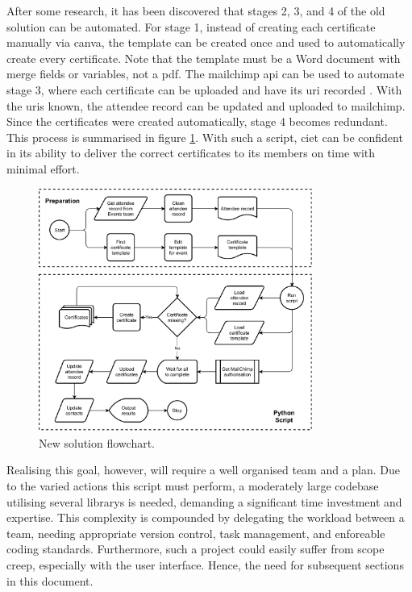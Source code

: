 \documentclass[11pt]{article}
\begin{document}
After some research, it has been discovered that stages 2, 3, and 4 of the old solution can be automated. For stage 1, instead of creating each certificate manually via \Gls{canva}, the template can be created once and used to automatically create every certificate. Note that the template must be a Word document with merge fields or variables, not a \acrshort{pdf}. The \Gls{mailchimp} \acrshort{api} can be used to automate stage 3, where each certificate can be uploaded and have its \acrshort{uri} recorded \cite{mailchimp-first-api-call}. With the \acrshort{uri}s known, the attendee record can be updated and uploaded to \Gls{mailchimp}. Since the certificates were created automatically, stage 4 becomes redundant. This process is summarised in figure \ref{fig:new-solution}. With such a script, \acrshort{ciet} can be confident in its ability to deliver the correct certificates to its members on time with minimal effort.

\begin{figure}[b!]
    \centering
    \includegraphics[width=0.8\textwidth]{figures/new_solution.pdf}
    \caption{New solution flowchart.}
    \label{fig:new-solution}
\end{figure}

Realising this goal, however, will require a well organised team and a plan. Due to the varied actions this script must perform, a moderately large codebase utilising several \glspl{library} is needed, demanding a significant time investment and expertise. This complexity is compounded by delegating the workload between a team, needing appropriate version control, task management, and enforeable coding standards. Furthermore, such a project could easily suffer from scope creep, especially with the \gls{user} interface. Hence, the need for subsequent sections in this document.
\end{document}

